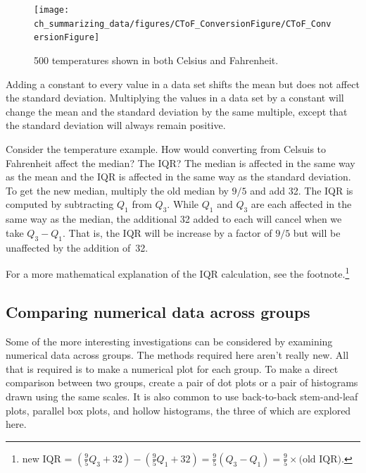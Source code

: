 \begin{figure}[h]
   \centering
   \texttt{[image: ch\_summarizing\_data/figures/CToF\_ConversionFigure/CToF\_ConversionFigure]}
   \caption{500 temperatures shown in both Celsius and \mbox{Fahrenheit.}}
   \label{CToF_ConversionFigure}
\end{figure}


\begin{termBox}{
Adding a constant to every value in a data set shifts the mean but does not affect the standard deviation. Multiplying the values in a data set by a constant will change the mean and the standard deviation by the same multiple, except that the standard deviation will always remain positive.}
\end{termBox}

\begin{example}{Consider the temperature example. How would converting from Celsuis to Fahrenheit affect the median? The IQR?}
The median is affected in the same way as the mean and the IQR is affected in the same way as the standard deviation. To get the new median, multiply the old median by $9/5$ and add 32. The IQR is computed by subtracting $Q_1$ from $Q_3$. While $Q_1$ and $Q_3$ are each affected in the same way as the median, the additional 32 added to each will cancel when we take $Q_3 - Q_1$. That is, the IQR will be increase by a factor of $9/5$ but will be unaffected by the addition of~32.

For a more mathematical explanation of the IQR calculation, see the footnote.\footnote{new IQR = $\left(\frac{9}{5} Q_3 + 32\right) - \left(\frac{9}{5} Q_1 + 32\right) = \frac{9}{5} \left(Q_3 - Q_1\right) = \frac{9}{5} \times \text{(old IQR)}$.}
\end{example}

\subsection{Comparing numerical data across groups}
\label{comparingAcrossGroups}



Some of the more interesting investigations can be considered by examining numerical data across groups. The methods required here aren't really new. All that is required is to make a numerical plot for each group. To make a direct comparison between two groups, create a pair of dot plots or a pair of histograms drawn using the same scales. It is also common to use back-to-back stem-and-leaf plots, parallel box plots, and hollow histograms, the three of which are explored here.

